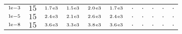 \begin{tiny}
\begin{tabular}{@{$\;$}c@{$\;$}|@{$\;$}c@{$\;$}@{$\;$}c@{$\;$}@{$\;$}c@{$\;$}@{$\;$}c@{$\;$}@{$\;$}c@{$\;$}|@{$\;$}c@{$\;$}@{$\;$}c@{$\;$}@{$\;$}c@{$\;$}@{$\;$}c@{$\;$}@{$\;$}c@{$\;$}}
$\scriptstyle1\!\mathrm{\hspace{0.10em}e}-3$ & $\scriptstyle15$ & $\scriptstyle1.7\mathrm{\hspace{0.10em}e}3$ & $\scriptstyle1.5\mathrm{\hspace{0.10em}e}3$ & $\scriptstyle2.0\mathrm{\hspace{0.10em}e}3$ & $\scriptstyle1.7\mathrm{\hspace{0.10em}e}3$ & $\scriptstyle.$ & $\scriptstyle.$ & $\scriptstyle.$ & $\scriptstyle.$ & $\scriptstyle.$\\ 
$\scriptstyle1\!\mathrm{\hspace{0.10em}e}-5$ & $\scriptstyle15$ & $\scriptstyle2.4\mathrm{\hspace{0.10em}e}3$ & $\scriptstyle2.1\mathrm{\hspace{0.10em}e}3$ & $\scriptstyle2.6\mathrm{\hspace{0.10em}e}3$ & $\scriptstyle2.4\mathrm{\hspace{0.10em}e}3$ & $\scriptstyle.$ & $\scriptstyle.$ & $\scriptstyle.$ & $\scriptstyle.$ & $\scriptstyle.$\\ 
$\scriptstyle1\!\mathrm{\hspace{0.10em}e}-8$ & $\scriptstyle15$ & $\scriptstyle3.6\mathrm{\hspace{0.10em}e}3$ & $\scriptstyle3.3\mathrm{\hspace{0.10em}e}3$ & $\scriptstyle3.8\mathrm{\hspace{0.10em}e}3$ & $\scriptstyle3.6\mathrm{\hspace{0.10em}e}3$ & $\scriptstyle.$ & $\scriptstyle.$ & $\scriptstyle.$ & $\scriptstyle.$ & $\scriptstyle.$\\ 
\end{tabular} 
\end{tiny} 
